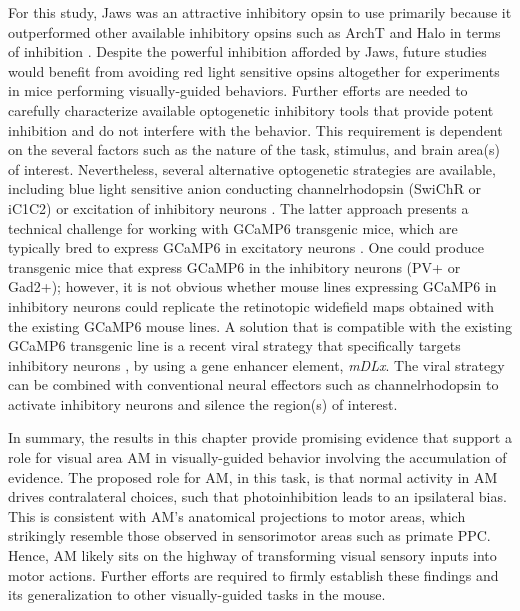 For this study, Jaws was an attractive inhibitory opsin to use primarily because it outperformed other available inhibitory opsins such as ArchT and Halo in terms of inhibition \parencite{Chuong2014}. Despite the powerful inhibition afforded by Jaws, future studies would benefit from avoiding red light sensitive opsins altogether for experiments in mice performing visually-guided behaviors. Further efforts are needed to carefully characterize available optogenetic inhibitory tools that provide potent inhibition and do not interfere with the behavior. This requirement is dependent on the several factors such as the nature of the task, stimulus, and brain area(s) of interest. Nevertheless, several alternative optogenetic strategies are available, including blue light sensitive anion conducting channelrhodopsin (SwiChR or iC1C2) \parencite{Berndt2014,Berndt2016} or excitation of inhibitory neurons \parencite{Madisen2012,Glickfeld2013b,Poort2015,Burgess2016}. The latter approach presents a technical challenge for working with GCaMP6 transgenic mice, which are typically bred to express GCaMP6 in excitatory neurons \parencite{Madisen2015}. One could produce transgenic mice that express GCaMP6 in the inhibitory neurons (PV+ or Gad2+); however, it is not obvious whether mouse lines expressing GCaMP6 in inhibitory neurons could replicate the retinotopic widefield maps obtained with the existing GCaMP6 mouse lines. A solution that is compatible with the existing GCaMP6 transgenic line is a recent viral strategy that specifically targets inhibitory neurons \parencite{Dimidschstein2016}, by using a gene enhancer element, \emph{mDLx}. The viral strategy can be combined with conventional neural effectors such as channelrhodopsin to activate inhibitory neurons and silence the region(s) of interest.\par 

In summary, the results in this chapter provide promising evidence that support a role for visual area AM in visually-guided behavior involving the accumulation of evidence. The proposed role for AM, in this task, is that normal activity in AM drives contralateral choices, such that photoinhibition leads to an ipsilateral bias. This is consistent with AM's anatomical projections to motor areas, which strikingly resemble those observed in sensorimotor areas such as primate PPC. Hence, AM likely sits on the highway of transforming visual sensory inputs into motor actions. Further efforts are required to firmly establish these findings and its generalization to other visually-guided tasks in the mouse. 



